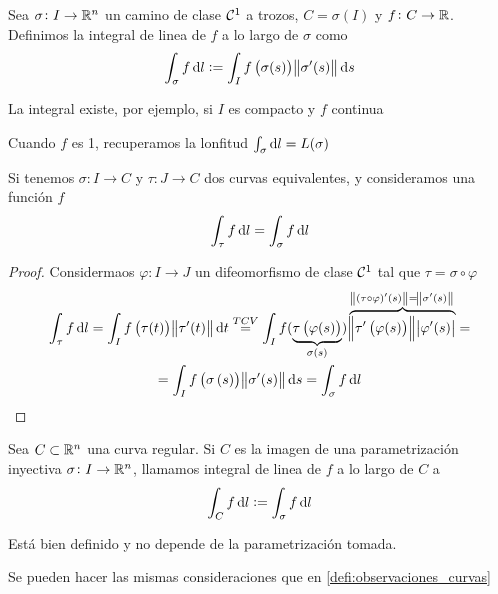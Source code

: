 \begin{defi}
    Sea $\sigma \colon I \to \mathbb{R}^n$ un camino de clase $\mathcal{C}^1$ a trozos, $C = \sigma(I)$ y $f \colon C \to \mathbb{R}$. Definimos
    la integral de linea de $f$ a lo largo de $\sigma$ como
    \[
        \int_\sigma f \dif l := \int_I f\left( \sigma(s) \right) \norm{\sigma^\prime(s)} \dif s
    \]

    La integral existe, por ejemplo, si $I$ es compacto y $f$ continua
\end{defi}

\begin{obs*}
    Cuando $f$ es 1, recuperamos la lonfitud $\int_\sigma \dif l = L(\sigma)$
\end{obs*}

\begin{prop}
    Si tenemos $\sigma \colon I \to C$ y $\tau \colon J \to C$ dos curvas equivalentes, y consideramos una función $f$
    \[
        \int_\tau f \dif l = \int_\sigma f \dif l
    \]
\end{prop}

\begin{proof}
    Considermaos $\varphi \colon I \to J$ un difeomorfismo de clase $\mathcal{C}^1$ tal que $\tau = \sigma \circ \varphi$
    \begin{gather*}
        \int_\tau f \dif l = \int_I f\left( \tau(t) \right) \norm{\tau^\prime(t)} \dif t \stackrel{TCV}{=}
        \int_I f( \underbrace{\tau\left( \varphi(s) \right)}_{\sigma(s)} ) \overbrace{\norm{\tau^\prime\left( \varphi(s) \right)}
        \abs{\varphi^\prime(s)}}^{\norm{(\tau \circ \varphi)^\prime (s)} = \norm{\sigma^\prime (s)}} = \\
        = \int_I f\left( \sigma\left( s \right) \right) \norm{\sigma^\prime(s)} \dif s = \int_\sigma f \dif l
    \end{gather*}
\end{proof}

\begin{defi}
    Sea $C \subset \mathbb{R}^n$ una curva regular. Si $C$ es la imagen de una parametrización inyectiva $\sigma \colon I \to \mathbb{R}^n$,
    llamamos integral de linea de $f$ a lo largo de $C$ a
    \[
        \int_C f \dif l := \int_\sigma f \dif l
    \]
\end{defi}

\begin{obs*}
    Está bien definido y no depende de la parametrización tomada.
\end{obs*}
\begin{obs*}
    Se pueden hacer las mismas consideraciones que en \ref{defi:observaciones_curvas} 
\end{obs*}

